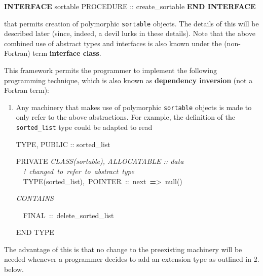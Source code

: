 \documentclass[
]{scrartcl}
\newenvironment{Shaded}{}{}
\newcommand{\CommentTok}[1]{\textcolor[rgb]{0.38,0.63,0.69}{\textit{#1}}}
\newcommand{\DataTypeTok}[1]{\textcolor[rgb]{0.56,0.13,0.00}{#1}}
\newcommand{\KeywordTok}[1]{\textcolor[rgb]{0.00,0.44,0.13}{\textbf{#1}}}
\newcommand{\NormalTok}[1]{#1}
\newcommand{\OperatorTok}[1]{\textcolor[rgb]{0.40,0.40,0.40}{#1}}
\begin{document}
\begin{Shaded}
\begin{Highlighting}[]
\KeywordTok{INTERFACE}\NormalTok{ sortable}
   \DataTypeTok{PROCEDURE} \DataTypeTok{::}\NormalTok{ create\_sortable}
\KeywordTok{END INTERFACE}
\end{Highlighting}
\end{Shaded}

that permits creation of polymorphic \texttt{sortable} objects. The
details of this will be described later (since, indeed, a devil lurks in
these details). Note that the above combined use of abstract types and
interfaces is also known under the (non-Fortran) term \textbf{interface
class}.

This framework permits the programmer to implement the following
programming technique, which is also known as \textbf{dependency
inversion} (not a Fortran term):

\begin{enumerate}
\def\labelenumi{\arabic{enumi}.}
\item
  Any machinery that makes use of polymorphic \texttt{sortable} objects
  is made to only refer to the above abstractions. For example, the
  definition of the \texttt{sorted\_list} type could be adapted to read

\begin{Shaded}
\begin{Highlighting}[]
\DataTypeTok{TYPE}\NormalTok{, }\DataTypeTok{PUBLIC} \DataTypeTok{::}\NormalTok{ sorted\_list}

\DataTypeTok{PRIVATE}
\CommentTok{CLASS(sortable), ALLOCATABLE :: data}
  \CommentTok{! changed to refer to abstract type}
  \DataTypeTok{TYPE(sorted\_list)}\NormalTok{, POINTER }\DataTypeTok{::}\NormalTok{ next }\KeywordTok{=}\OperatorTok{\textgreater{}}\NormalTok{ null()}

\CommentTok{CONTAINS}

\NormalTok{  FINAL }\DataTypeTok{::}\NormalTok{ delete\_sorted\_list}

\DataTypeTok{END TYPE}
\end{Highlighting}
\end{Shaded}
\end{enumerate}

The advantage of this is that no change to the preexisting machinery
will be needed whenever a programmer decides to add an extension type as
outlined in 2. below.
\end{document}
